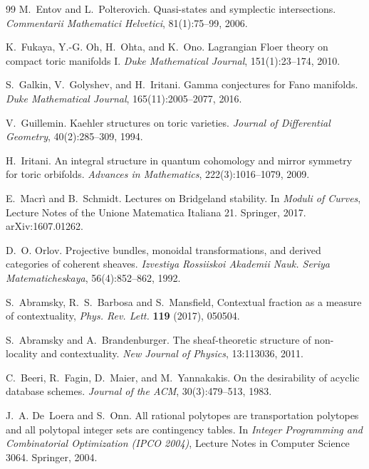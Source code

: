 \documentclass[11pt]{article}
\theoremstyle{definition}
\theoremstyle{remark}
\begin{document}
\begin{thebibliography}{99}
M.~Entov and L.~Polterovich.
\newblock Quasi-states and symplectic intersections.
\newblock \emph{Commentarii Mathematici Helvetici}, 81(1):75--99, 2006.

K.~Fukaya, Y.-G. Oh, H.~Ohta, and K.~Ono.
\newblock Lagrangian {F}loer theory on compact toric manifolds {I}.
\newblock \emph{Duke Mathematical Journal}, 151(1):23--174, 2010.

S.~Galkin, V.~Golyshev, and H.~Iritani.
\newblock Gamma conjectures for {F}ano manifolds.
\newblock \emph{Duke Mathematical Journal}, 165(11):2005--2077, 2016.

V.~Guillemin.
\newblock Kaehler structures on toric varieties.
\newblock \emph{Journal of Differential Geometry}, 40(2):285--309, 1994.

H.~Iritani.
\newblock An integral structure in quantum cohomology and mirror symmetry for toric orbifolds.
\newblock \emph{Advances in Mathematics}, 222(3):1016--1079, 2009.

E.~Macr\`i and B.~Schmidt.
\newblock Lectures on {B}ridgeland stability.
\newblock In \emph{Moduli of Curves}, Lecture Notes of the Unione Matematica Italiana 21. Springer,
2017. arXiv:1607.01262.

D.~O. Orlov.
\newblock Projective bundles, monoidal transformations, and derived categories of coherent sheaves.
\newblock \emph{Izvestiya Rossiiskoi Akademii Nauk. Seriya Matematicheskaya}, 56(4):852--862, 1992.

S.~Abramsky, R.~S.~Barbosa and S.~Mansfield, Contextual fraction as a measure of contextuality, \emph{Phys. Rev.
Lett.} \textbf{119} (2017), 050504.

S.~Abramsky and A.~Brandenburger.
\newblock The sheaf-theoretic structure of non-locality and contextuality.
\newblock \emph{New Journal of Physics}, 13:113036, 2011.

C.~Beeri, R.~Fagin, D.~Maier, and M.~Yannakakis.
\newblock On the desirability of acyclic database schemes.
\newblock \emph{Journal of the ACM}, 30(3):479--513, 1983.

J.~A. De~Loera and S.~Onn.
\newblock All rational polytopes are transportation polytopes and all polytopal integer sets are contingency
tables.
\newblock In \emph{Integer Programming and Combinatorial Optimization (IPCO 2004)}, Lecture Notes in Computer
Science 3064. Springer, 2004.


\end{thebibliography}
\end{document}
